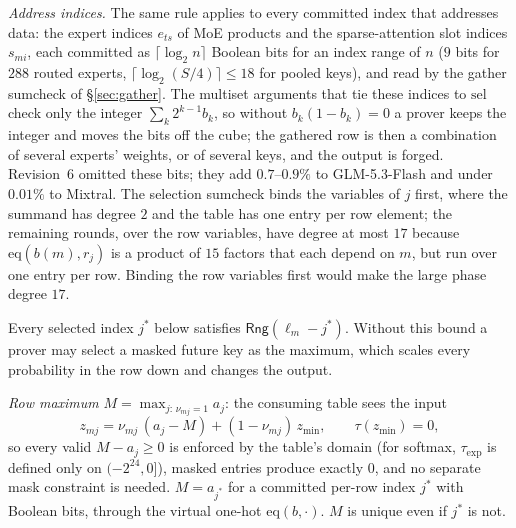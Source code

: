 \documentclass[11pt]{article}
\newcommand{\Rng}{\mathsf{Rng}}
\begin{document}
\emph{Address indices.}
The same rule applies to every committed index that addresses data: the expert indices \(e_{ts}\) of MoE products and the sparse-attention slot indices \(s_{mi}\), each committed as \(\lceil \log_2 n \rceil\) Boolean bits for an index range of \(n\) (\(9\) bits for \(288\) routed experts, \(\lceil\log_2(S/4)\rceil \le 18\) for pooled keys), and read by the gather sumcheck of \S\ref{sec:gather}.
The multiset arguments that tie these indices to \(\mathrm{sel}\) check only the integer \(\sum_k 2^{k-1} b_k\), so without \(b_k(1-b_k) = 0\) a prover keeps the integer and moves the bits off the cube; the gathered row is then a combination of several experts' weights, or of several keys, and the output is forged.
Revision~6 omitted these bits; they add \(0.7\)--\(0.9\%\) to GLM-5.3-Flash and under \(0.01\%\) to Mixtral.
The selection sumcheck binds the variables of \(j\) first, where the summand has degree \(2\) and the table has one entry per row element; the remaining rounds, over the row variables, have degree at most \(17\) because \(\mathrm{eq}(b(m), r_j)\) is a product of \(15\) factors that each depend on \(m\), but run over one entry per row.
Binding the row variables first would make the large phase degree \(17\).

Every selected index \(j^\ast\) below satisfies \(\Rng(\ell_m - j^\ast)\).
Without this bound a prover may select a masked future key as the maximum, which scales every probability in the row down and changes the output.

\emph{Row maximum} \(M = \max_{j:\, \nu_{mj} = 1} a_j\): the consuming table sees the input
\[
z_{mj} = \nu_{mj}\,(a_j - M) + (1 - \nu_{mj})\, z_{\min},\qquad \tau(z_{\min}) = 0,
\]
so every valid \(M - a_j \ge 0\) is enforced by the table's domain (for softmax, \(\tau_{\exp}\) is defined only on \((-2^{24}, 0]\)), masked entries produce exactly \(0\), and no separate mask constraint is needed.
\(M = a_{j^\ast}\) for a committed per-row index \(j^\ast\) with Boolean bits, through the virtual one-hot \(\mathrm{eq}(b, \cdot)\).
\(M\) is unique even if \(j^\ast\) is not.
\end{document}
